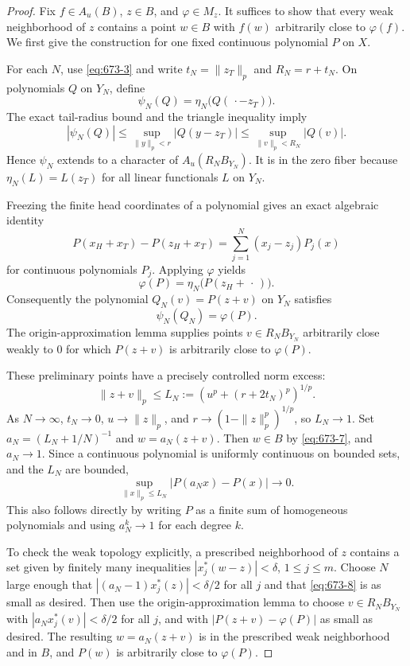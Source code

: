 \documentclass[11pt,a4paper]{article}
\theoremstyle{remark}
\begin{document}
\begin{proof}
Fix $f\in A_u(B)$, $z\in B$, and $\varphi\in M_z$.
It suffices to show that every weak neighborhood of $z$ contains
a point $w\in B$ with $f(w)$ arbitrarily close to $\varphi(f)$.
We first give the construction for one fixed continuous polynomial
$P$ on $X$.

For each $N$, use \eqref{eq:673-3} and write $t_N=\|z_T\|_p$ and
$R_N=r+t_N$.  On polynomials $Q$ on $Y_N$, define
\[
 \psi_N(Q)=\eta_N\bigl(Q(\,\cdot-z_T)\bigr).
\]
The exact tail-radius bound and the triangle inequality imply
\[
 |\psi_N(Q)|
 \le\sup_{\|y\|_p<r}|Q(y-z_T)|
 \le\sup_{\|v\|_p<R_N}|Q(v)|.
\]
Hence $\psi_N$ extends to a character of $A_u(R_NB_{Y_N})$.
It is in the zero fiber because
$\eta_N(L)=L(z_T)$ for all linear functionals $L$ on $Y_N$.

Freezing the finite head coordinates of a polynomial gives an exact
algebraic identity
\[
 P(x_H+x_T)-P(z_H+x_T)
 =\sum_{j=1}^N(x_j-z_j)P_j(x)
\]
for continuous polynomials $P_j$.  Applying $\varphi$ yields
\[
 \varphi(P)=\eta_N\bigl(P(z_H+\,\cdot\,)\bigr).
\]
Consequently the polynomial $Q_N(v)=P(z+v)$ on $Y_N$ satisfies
\begin{equation}
 \psi_N(Q_N)=\varphi(P).
 \label{eq:673-6}
\end{equation}
The origin-approximation lemma supplies points $v\in R_NB_{Y_N}$
arbitrarily close weakly to $0$ for which $P(z+v)$ is arbitrarily
close to $\varphi(P)$.

These preliminary points have a precisely controlled norm excess:
\begin{equation}
 \|z+v\|_p
 \le L_N:=\left(u^p+(r+2t_N)^p\right)^{1/p}.
 \label{eq:673-7}
\end{equation}
As $N\to\infty$, $t_N\to0$, $u\to\|z\|_p$, and
$r\to(1-\|z\|_p^p)^{1/p}$, so $L_N\to1$.
Set $a_N=(L_N+1/N)^{-1}$ and $w=a_N(z+v)$.
Then $w\in B$ by \eqref{eq:673-7}, and $a_N\to1$.
Since a continuous polynomial is uniformly continuous on bounded
sets, and the $L_N$ are bounded,
\begin{equation}
 \sup_{\|x\|_p\le L_N}|P(a_Nx)-P(x)|\longrightarrow0.
 \label{eq:673-8}
\end{equation}
This also follows directly by writing $P$ as a finite sum of
homogeneous polynomials and using $a_N^k\to1$ for each degree $k$.

To check the weak topology explicitly, a prescribed neighborhood of
$z$ contains a set given by finitely many inequalities
$|x_j^*(w-z)|<\delta$, $1\le j\le m$.
Choose $N$ large enough that
$|(a_N-1)x_j^*(z)|<\delta/2$ for all $j$ and that \eqref{eq:673-8} is as
small as desired.  Then use the origin-approximation lemma to choose
$v\in R_NB_{Y_N}$ with $|a_Nx_j^*(v)|<\delta/2$ for all $j$, and
with $|P(z+v)-\varphi(P)|$ as small as desired.
The resulting $w=a_N(z+v)$ is in the prescribed weak neighborhood
and in $B$, and $P(w)$ is arbitrarily close to $\varphi(P)$.


\end{proof}
\end{document}

